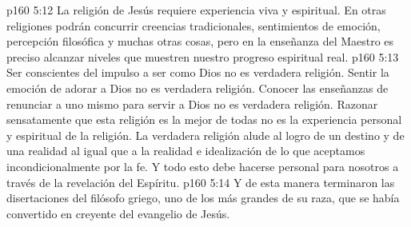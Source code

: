 \vs p160 5:12 La religión de Jesús requiere experiencia viva y espiritual. En otras religiones podrán concurrir creencias tradicionales, sentimientos de emoción, percepción filosófica y muchas otras cosas, pero en la enseñanza del Maestro es preciso alcanzar niveles que muestren nuestro progreso espiritual real.
\vs p160 5:13 Ser conscientes del impulso a ser como Dios no es verdadera religión. Sentir la emoción de adorar a Dios no es verdadera religión. Conocer las enseñanzas de renunciar a uno mismo para servir a Dios no es verdadera religión. Razonar sensatamente que esta religión es la mejor de todas no es la experiencia personal y espiritual de la religión. La verdadera religión alude al logro de un destino y de una realidad al igual que a la realidad e idealización de lo que aceptamos incondicionalmente por la fe. Y todo esto debe hacerse personal para nosotros a través de la revelación del Espíritu.
\vs p160 5:14 \pc Y de esta manera terminaron las disertaciones del filósofo griego, uno de los más grandes de su raza, que se había convertido en creyente del evangelio de Jesús.
